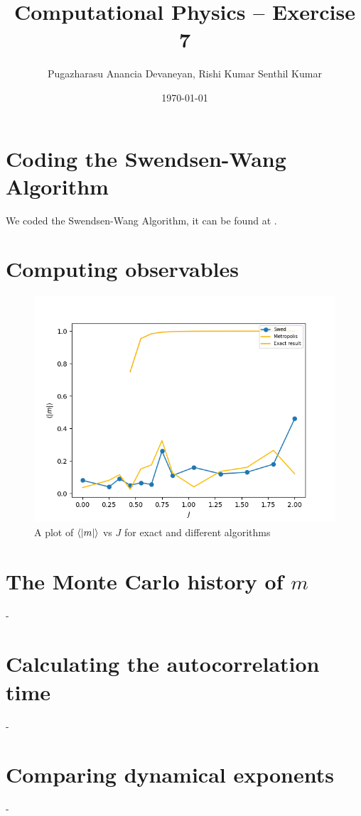 \documentclass{cernatsnote}
\title{Computational Physics – Exercise 7}
\author{Pugazharasu Anancia Devaneyan, Rishi Kumar Senthil Kumar}
\date{\today}
\begin{document}
\maketitle



\section{Coding the Swendsen-Wang Algorithm}
We coded the Swendsen-Wang Algorithm, it can be found at \cite{github}.
\section{Computing observables}
\begin{figure}[H]
    \centering
    \includegraphics[scale = 0.5]{images/m_v_j.png}
    \caption{A plot of $\expval{|m|}$ vs $J$ for exact and different algorithms}
    \label{fig:my_label}
\end{figure}

\section{The Monte Carlo history of $m$}
-
\section{Calculating the autocorrelation time}
-
\section{Comparing dynamical exponents}
-


\end{document}
